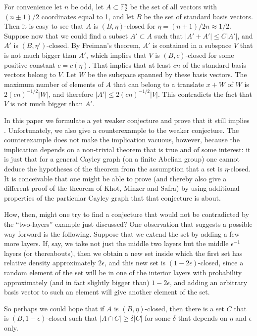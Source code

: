 \documentclass{toc}
\newcommand\eps{\epsilon}  %
\newcommand\F{\mathbb{F}}
\renewcommand\d{\delta}
\begin{document}
For convenience let $n$ be odd, let $A\subset\F_2^n$ be the set of all vectors with $(n\pm 1)/2$ coordinates equal to 1, and let $B$ be the set of standard basis vectors. Then it is easy to see that $A$ is $(B,\eta)$-closed for $\eta=(n+1)/2n\approx 1/2$. Suppose now that we could find a subset $A'\subset A$ such that $|A'+A'|\leq C|A'|$, and $A'$ is $(B,\eta')$-closed. By Freiman's theorem, $A'$ is contained in a subspace $V$ that is not much bigger than $A'$, which implies that $V$ is $(B,c)$-closed for some positive constant $c=c(\eta)$. That implies that at least $cn$ of the standard basis vectors belong to $V$. Let $W$ be the subspace spanned by these basis vectors. The maximum number of elements of $A$ that can belong to a translate $x+W$ of $W$ is $2(cn)^{-1/2}|W|$, and therefore $|A'|\leq 2(cn)^{-1/2}|V|$. This contradicts the fact that $V$ is not much bigger than $A'$.

In this paper we formulate a yet weaker conjecture and prove that it still implies . Unfortunately, we also give a counterexample to the weaker conjecture. The counterexample does not make the implication 
vacuous, however, because the implication depends on a non-trivial theorem that is true and of some interest: it is just that for a general Cayley graph (on a finite Abelian group) one cannot deduce the hypotheses of the theorem from the assumption that a set is $\eta$-closed. It is conceivable that one might be able to prove  (and thereby also give a different proof of the theorem of Khot, Minzer and Safra) by using additional properties of the particular Cayley graph that that conjecture is about.

How, then, might one try to find a conjecture that would not be contradicted by the ``two-layers'' example just discussed? One observation that suggests a possible way forward is the following. Suppose that we extend the set by adding a few more layers. If, say, we take not just the middle two layers but the middle $\eps^{-1}$ layers (or thereabouts), then we obtain a new set inside which the first set has relative density approximately $2\eps$, and this new set is  $(1-2\eps)$-closed, since a random element of the set will be in one of the interior layers with probability approximately (and in fact slightly bigger than) $1-2\eps$, and adding an arbitrary basis vector to such an element will give another element of the set.

So perhaps we could hope that if $A$ is $(B,\eta)$-closed, then there is a set $C$ that is  $(B,1-\eps)$-closed such that $|A\cap C|\geq\d|C|$ for some $\d$ that depends on $\eta$ and $\eps$ only.
\end{document}
